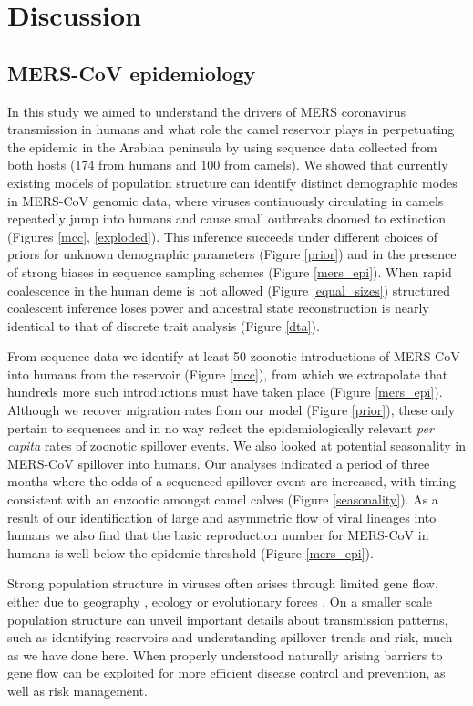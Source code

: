 \documentclass[11pt,oneside,letterpaper]{article}
\def\lmc#1{\textcolor{green}{[#1]}}
\begin{document}
\section*{Discussion}

\subsection*{MERS-CoV epidemiology}
In this study we aimed to understand the drivers of MERS coronavirus transmission in humans and what role the camel reservoir plays in perpetuating the epidemic in the Arabian peninsula by using sequence data collected from both hosts (174 from humans and 100 from camels).
We showed that currently existing models of population structure \citep{vaughan_efficient_2014} can identify distinct demographic modes in MERS-CoV genomic data, where viruses continuously circulating in camels repeatedly jump into humans and cause small outbreaks doomed to extinction (Figures \ref{mcc}, \ref{exploded}).
This inference succeeds under different choices of priors for unknown demographic parameters (Figure \ref{prior}) and in the presence of strong biases in sequence sampling schemes (Figure \ref{mers_epi}).
When rapid coalescence in the human deme is not allowed (Figure \ref{equal_sizes}) structured coalescent inference loses power and ancestral state reconstruction is nearly identical to that of discrete trait analysis (Figure \ref{dta}).

From sequence data we identify at least 50 zoonotic introductions of MERS-CoV into humans from the reservoir (Figure \ref{mcc}), from which we extrapolate that hundreds more such introductions must have taken place (Figure \ref{mers_epi}).
Although we recover migration rates from our model (Figure \ref{prior}), these only pertain to sequences and in no way reflect the epidemiologically relevant \textit{per capita} rates of zoonotic spillover events.
We also looked at potential seasonality in MERS-CoV spillover into humans.
Our analyses indicated a period of three months where the odds of a sequenced spillover event are increased, with timing consistent with an enzootic amongst camel calves (Figure \ref{seasonality}).
As a result of our identification of large and asymmetric flow of viral lineages into humans we also find that the basic reproduction number for MERS-CoV in humans is well below the epidemic threshold (Figure \ref{mers_epi}).

Strong population structure in viruses often arises through limited gene flow, either due to geography \citep{dudas_virus_2017}, ecology \citep{smith_dating_2009} or evolutionary forces \citep{turner_genomic_2005,dudas_reassortment_2015}.
On a smaller scale population structure can unveil important details about transmission patterns, such as identifying reservoirs and understanding spillover trends and risk, much as we have done here.
When properly understood naturally arising barriers to gene flow can be exploited for more efficient disease control and prevention, as well as risk management.
\end{document}
